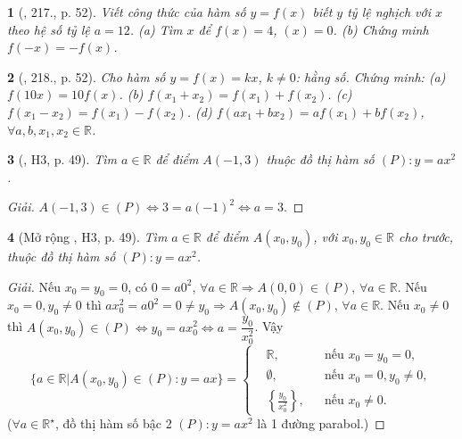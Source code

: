 \documentclass{article}
\newtheorem{baitoan}{}
\begin{document}
\begin{baitoan}[\cite{Tuyen_Toan_8}, 217., p. 52]
	Viết công thức của hàm số $y = f(x)$ biết $y$ tỷ lệ nghịch với $x$ theo hệ số tỷ lệ $a = 12$. (a) Tìm $x$ để $f(x) = 4$, $(x) = 0$. (b) Chứng minh $f(-x) = -f(x)$.
\end{baitoan}

\begin{baitoan}[\cite{Tuyen_Toan_8}, 218., p. 52]
	Cho hàm số $y = f(x) = kx$, $k\ne0$: hằng số. Chứng minh: (a) $f(10x) = 10f(x)$. (b) $f(x_1 + x_2) = f(x_1) + f(x_2)$. (c) $f(x_1 - x_2) = f(x_1) - f(x_2)$. (d) $f(ax_1 + bx_2) = af(x_1) + bf(x_2)$, $\forall a,b,x_1,x_2\in\mathbb{R}$.
\end{baitoan}

\begin{baitoan}[\cite{Binh_boi_duong_Toan_9_tap_1}, H3, p. 49]
	Tìm $a\in\mathbb{R}$ để điểm $A(-1,3)$ thuộc đồ thị hàm số $(P):y = ax^2$.
\end{baitoan}

\begin{proof}[Giải]
	$A(-1,3)\in(P)\Leftrightarrow3 = a(-1)^2\Leftrightarrow a = 3$.
\end{proof}

\begin{baitoan}[Mở rộng \cite{Binh_boi_duong_Toan_9_tap_1}, H3, p. 49]
	Tìm $a\in\mathbb{R}$ để điểm $A(x_0,y_0)$, với $x_0,y_0\in\mathbb{R}$ cho trước, thuộc đồ thị hàm số $(P):y = ax^2$.
\end{baitoan}

\begin{proof}[Giải]
	Nếu $x_0 = y_0 = 0$, có $0 = a0^2$, $\forall a\in\mathbb{R}\Rightarrow A(0,0)\in(P)$, $\forall a\in\mathbb{R}$. Nếu $x_0 = 0,y_0\ne0$ thì $ax_0^2 = a0^2 = 0\ne y_0\Rightarrow A(x_0,y_0)\notin(P)$, $\forall a\in\mathbb{R}$. Nếu $x_0\ne0$ thì $A(x_0,y_0)\in(P)\Leftrightarrow y_0 = ax_0^2\Leftrightarrow a = \dfrac{y_0}{x_0^2}$. Vậy
	\begin{equation*}
		\{a\in\mathbb{R}|A(x_0,y_0)\in(P):y = ax\} = \left\{\begin{split}
			&\mathbb{R},&&\mbox{nếu } x_0 = y_0 = 0,\\
			&\emptyset,&&\mbox{nếu } x_0 = 0,y_0\ne0,\\
			&\left\{\frac{y_0}{x_0^2}\right\},&&\mbox{nếu } x_0\ne0.
		\end{split}\right.
	\end{equation*}
	($\forall a\in\mathbb{R}^\star$, đồ thị hàm số bậc 2 $(P):y = ax^2$ là 1 đường parabol.)
\end{proof}
\end{document}
